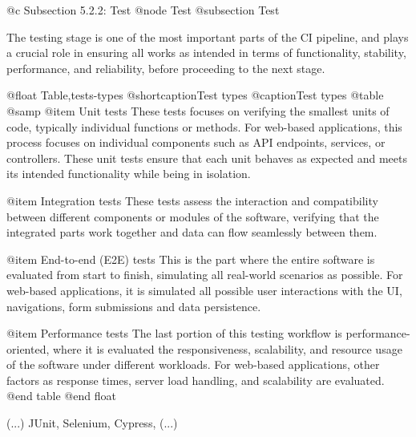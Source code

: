 @c Subsection 5.2.2: Test
@node Test
@subsection Test

The testing stage is one of the most important parts of the CI pipeline, and plays a crucial role in ensuring all works as intended in terms of functionality, stability, performance, and reliability, before proceeding to the next stage.

@float Table,tests-types
@shortcaption{Test types}
@caption{Test types}
@table @samp
@item Unit tests
These tests focuses on verifying the smallest units of code, typically individual functions or methods. For web-based applications, this process focuses on individual components such as API endpoints, services, or controllers. These unit tests ensure that each unit behaves as expected and meets its intended functionality while being in isolation.

@item Integration tests
These tests assess the interaction and compatibility between different components or modules of the software, verifying that the integrated parts work together and data can flow seamlessly between them.

@item End-to-end (E2E) tests
This is the part where the entire software is evaluated from start to finish, simulating all real-world scenarios as possible. For web-based applications, it is simulated all possible user interactions with the UI, navigations, form submissions and data persistence.

@item Performance tests
The last portion of this testing workflow is performance-oriented, where it is evaluated the responsiveness, scalability, and resource usage of the software under different workloads. For web-based applications, other factors as response times, server load handling, and scalability are evaluated.
@end table
@end float

(...) JUnit, Selenium, Cypress, (...)

